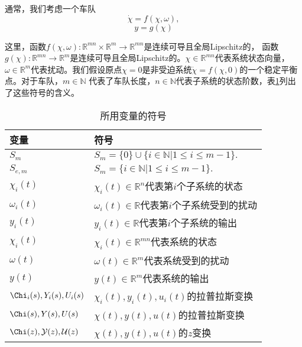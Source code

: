 \begin{translation}
  通常，我们考虑一个车队
  \begin{equation}
    \dot{\chi} = f(\chi, \omega),
    \label{eq:appendix-equation-7}
  \end{equation}
  \begin{equation}
    y = g(\chi)
  \end{equation}

  这里，函数$f(\chi, \omega): \mathbb{R}^{mn} \times \mathbb{R}^m \rightarrow \mathbb{R}^{mn}$是连续可导且全局Lipschitz的，
  函数$g(\chi): \mathbb{R}^{mn} \rightarrow \mathbb{R}^{m}$是连续可导且全局Lipschitz的。$\chi \in \mathbb{R}^{mn}$代表系统状态向量，
  $\omega \in \mathbb{R}^m$代表扰动。我们假设原点$\chi = 0$是非受迫系统$\dot{\chi} = f(\chi, 0)$的一个稳定平衡点。对于车队，$m \in \mathbb{N}$
  代表了车队长度，$n \in \mathbb{N}$代表子系统的状态阶数，表\ref{tab:appendix-translation-table1}列出了这些符号的含义。

  \begin{table}
    \centering
    \caption{所用变量的符号}
    \begin{tabular}{ll}
      \toprule
      变量          & 符号                        \\
      \midrule
      $S_m$           & $S_m = \{0\} \cup \{i \in \mathbb{N} | 1 \leqslant i \leqslant m-1 \}.$ \\
      $S_{e,m}$       & $S_m = \{i \in \mathbb{N} | 1 \leqslant i \leqslant m-1 \}.$                     \\
      $\chi_i(t)$     & $\chi_i(t) \in \mathbb{R}^n$代表第$i$个子系统的状态   \\
      $\omega_i(t)$   & $\omega_i(t) \in \mathbb{R}$代表第$i$个子系统受到的扰动 \\
      $y_i(t)$        & $y_i(t) \in \mathbb{R}$代表第$i$个子系统的输出        \\
      $\chi_i(t)$     & $\chi_i(t) \in \mathbb{R}^{mn}$代表系统的状态        \\
      $\omega(t)$     & $\omega(t) \in \mathbb{R}^m$代表系统受到的扰动        \\
      $y(t)$          & $y(t) \in \mathbb{R}^m$代表系统的输出        \\
      $\Chi_i(s), Y_i(s), U_i(s)$   & $\chi_i(t), y_i(t), u_i(t)$的拉普拉斯变换        \\
      $\Chi(s), Y(s), U(s)$         & $\chi(t), y(t), u(t)$的拉普拉斯变换        \\
      $\mathcal{\Chi}(z), \mathcal{Y}(z), \mathcal{U}(z)$   & $\chi(t), y(t), u(t)$的$z$变换        \\
      \bottomrule
    \end{tabular}
    \label{tab:appendix-translation-table1}
  \end{table}



\end{translation}
